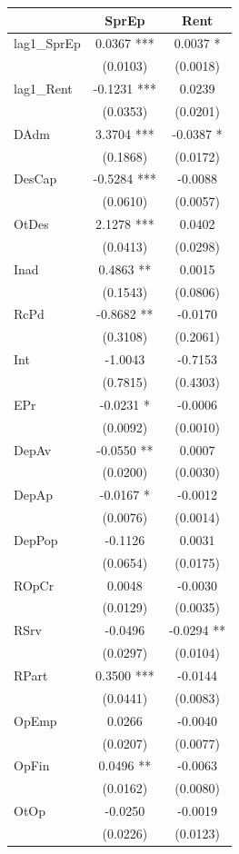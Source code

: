 \documentclass[
  12pt,
  12pt,
  openright,
  oneside,
  a4paper,
  chapter=TITLE,
  section=TITLE,
  subsection=TITLE,
  subsubsection=TITLE,
  english,
  portugues,
  sumario=tradicional]{abntex2}
\begin{document}
\begin{longtable}[]{@{}lcc@{}}
\toprule
& SprEp & Rent \\
\midrule
\endhead
lag1\_SprEp & 0.0367 *** & 0.0037 * \\
& (0.0103) & (0.0018) \\
lag1\_Rent & -0.1231 *** & 0.0239 \\
& (0.0353) & (0.0201) \\
DAdm & 3.3704 *** & -0.0387 * \\
& (0.1868) & (0.0172) \\
DesCap & -0.5284 *** & -0.0088 \\
& (0.0610) & (0.0057) \\
OtDes & 2.1278 *** & 0.0402 \\
& (0.0413) & (0.0298) \\
Inad & 0.4863 ** & 0.0015 \\
& (0.1543) & (0.0806) \\
RcPd & -0.8682 ** & -0.0170 \\
& (0.3108) & (0.2061) \\
Int & -1.0043 & -0.7153 \\
& (0.7815) & (0.4303) \\
EPr & -0.0231 * & -0.0006 \\
& (0.0092) & (0.0010) \\
DepAv & -0.0550 ** & 0.0007 \\
& (0.0200) & (0.0030) \\
DepAp & -0.0167 * & -0.0012 \\
& (0.0076) & (0.0014) \\
DepPop & -0.1126 & 0.0031 \\
& (0.0654) & (0.0175) \\
ROpCr & 0.0048 & -0.0030 \\
& (0.0129) & (0.0035) \\
RSrv & -0.0496 & -0.0294 ** \\
& (0.0297) & (0.0104) \\
RPart & 0.3500 *** & -0.0144 \\
& (0.0441) & (0.0083) \\
OpEmp & 0.0266 & -0.0040 \\
& (0.0207) & (0.0077) \\
OpFin & 0.0496 ** & -0.0063 \\
& (0.0162) & (0.0080) \\
OtOp & -0.0250 & -0.0019 \\
& (0.0226) & (0.0123) \\

\end{longtable}
\end{document}
